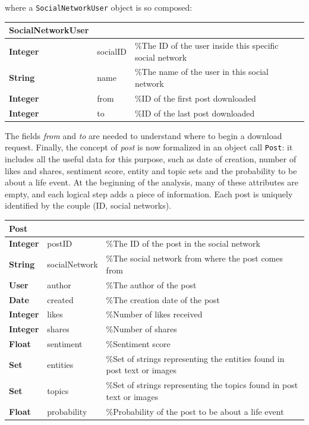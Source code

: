 where a \texttt{SocialNetworkUser} object is so composed:

\begin{center}
\label{tab:social}
\begin{tabular}{lll}
\hline
SocialNetworkUser & & \\
\hline
\textbf{Integer} & socialID & \%The ID of the user inside this specific social network \\
\textbf{String} & name & \%The name of the user in this social network \\
\textbf{Integer} & from & \%ID of the first post downloaded \\
\textbf{Integer} & to & \%ID of the last post downloaded \\
\hline
\end{tabular}
\end{center}

The fields \emph{from} and \emph{to} are needed to understand where to begin a download request. Finally, the concept of \emph{post} is now formalized in an object call \texttt{Post}: it includes all the useful data for this purpose, such as date of creation, number of likes and shares, sentiment score, entity and topic sets and the probability to be about a life event. At the beginning of the analysis, many of these attributes are empty, and each logical step adds a piece of information. Each post is uniquely identified by the couple (ID, social networks).

\begin{center}
\label{tab:post}
\begin{tabular}{lll}
\hline
Post & & \\
\hline
\textbf{Integer} & postID & \%The ID of the post in the social network\\
\textbf{String} & socialNetwork & \%The social network from where the post comes from \\
\textbf{User} & author & \%The author of the post \\
\textbf{Date} & created & \%The creation date of the post \\
\textbf{Integer} & likes & \%Number of likes received \\
\textbf{Integer} & shares & \%Number of shares \\
\textbf{Float} & sentiment & \%Sentiment score \\
\textbf{Set} & entities & \%Set of strings representing the entities found in post text or images \\
\textbf{Set} & topics & \%Set of strings representing the topics found in post text or images \\
\textbf{Float} & probability & \%Probability of the post to be about a life event \\
\hline
\end{tabular}
\end{center}

